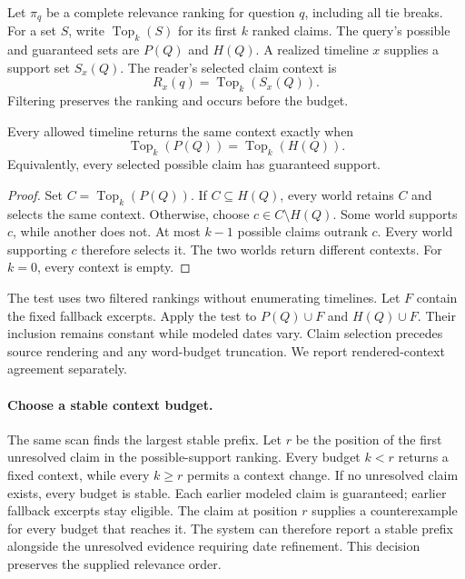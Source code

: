 Let $\pi_q$ be a complete relevance ranking for question $q$, including all tie breaks.
For a set $S$, write $\operatorname{Top}_k(S)$ for its first $k$ ranked claims.
The query's possible and guaranteed sets are $P(Q)$ and $H(Q)$.
A realized timeline $x$ supplies a support set $S_x(Q)$.
The reader's selected claim context is
\begin{equation}
 R_x(q)=\operatorname{Top}_k(S_x(Q)).
\label{eq:context}
\end{equation}
Filtering preserves the ranking and occurs before the budget.

\begin{theorem}
\label{thm:context-stability}
Every allowed timeline returns the same context exactly when
\begin{equation}
 \operatorname{Top}_k(P(Q))=\operatorname{Top}_k(H(Q)).
\label{eq:context-stability}
\end{equation}
Equivalently, every selected possible claim has guaranteed support.
\end{theorem}
\begin{proof}
Set $C=\operatorname{Top}_k(P(Q))$.
If $C\subseteq H(Q)$, every world retains $C$ and selects the same context.
Otherwise, choose $c\in C\setminus H(Q)$.
Some world supports $c$, while another does not.
At most $k-1$ possible claims outrank $c$.
Every world supporting $c$ therefore selects it.
The two worlds return different contexts.
For $k=0$, every context is empty.
\end{proof}

The test uses two filtered rankings without enumerating timelines.
Let $F$ contain the fixed fallback excerpts.
Apply the test to $P(Q)\cup F$ and $H(Q)\cup F$.
Their inclusion remains constant while modeled dates vary.
Claim selection precedes source rendering and any word-budget truncation.
We report rendered-context agreement separately.

\paragraph{Choose a stable context budget.}
The same scan finds the largest stable prefix.
Let $r$ be the position of the first unresolved claim in the possible-support ranking.
Every budget $k<r$ returns a fixed context, while every $k\ge r$ permits a context change.
If no unresolved claim exists, every budget is stable.
Each earlier modeled claim is guaranteed; earlier fallback excerpts stay eligible.
The claim at position $r$ supplies a counterexample for every budget that reaches it.
The system can therefore report a stable prefix alongside the unresolved evidence requiring date refinement.
This decision preserves the supplied relevance order.

